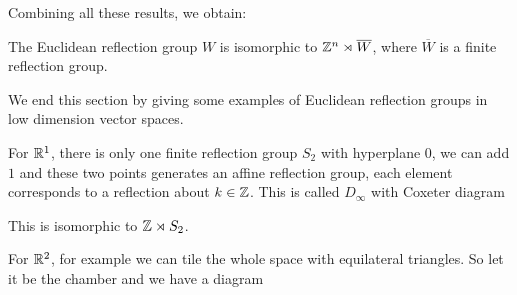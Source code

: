 \documentclass[../main.tex]{subfiles}
\begin{document}
Combining all these results, we obtain:
\begin{theorem}
    The Euclidean reflection group $W$ is isomorphic to $\mathbb{Z}^n \rtimes \overline W$, where $\overline W$ is a finite reflection group.
\end{theorem}

We end this section by giving some examples of Euclidean reflection groups in low dimension vector spaces.

For $\mathbb{R}^1$, there is only one finite reflection group $S_2$ with hyperplane $0$, we can add $1$ and these two points generates an affine reflection group, each element corresponds to a reflection about $k\in \mathbb{Z}$. This is called $D_{\infty}$ with Coxeter diagram 


This is isomorphic to $\mathbb{Z} \rtimes S_2$.

For $\mathbb{R}^2$, for example we can tile the whole space with equilateral triangles. So let it be the chamber and we have a diagram 

\end{document}

